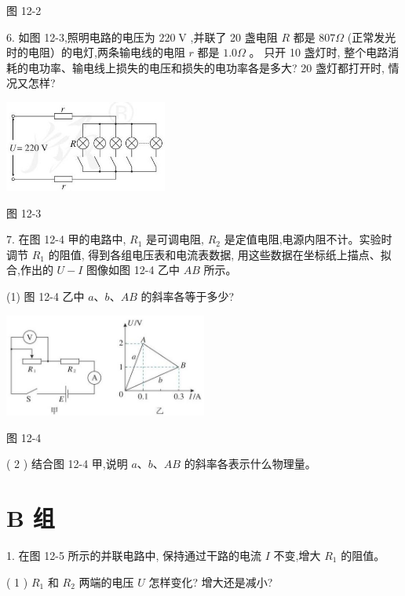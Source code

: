 \documentclass[10pt]{article}
\begin{document}
图 12-2

6. 如图 12-3,照明电路的电压为 \({220}\mathrm{\;V}\) ,并联了 20 盏电阻 \(R\) 都是 \({807\Omega }\) (正常发光时的电阻）的电灯,两条输电线的电阻 \(r\) 都是 \({1.0\Omega }\) 。 只开 10 盏灯时, 整个电路消耗的电功率、输电线上损失的电压和损失的电功率各是多大? 20 盏灯都打开时, 情况又怎样?

\begin{center}
\includegraphics[max width=0.4\textwidth]{images/01911d5f-8e38-70c0-b5b8-2b399bd115b6_105_726487.jpg}
\end{center}

图 12-3

7. 在图 12-4 甲的电路中, \({R}_{1}\) 是可调电阻, \({R}_{2}\) 是定值电阻,电源内阻不计。实验时调节 \({R}_{1}\) 的阻值, 得到各组电压表和电流表数据, 用这些数据在坐标纸上描点、拟合,作出的 \(U - I\) 图像如图 12-4 乙中 \({AB}\) 所示。

(1) 图 12-4 乙中 \(a\text{、}b\text{、}{AB}\) 的斜率各等于多少?

\begin{center}
\includegraphics[max width=0.5\textwidth]{images/01911d5f-8e38-70c0-b5b8-2b399bd115b6_106_719440.jpg}
\end{center}

图 12-4

( 2 ) 结合图 12-4 甲,说明 \(a\text{、}b\text{、}{AB}\) 的斜率各表示什么物理量。

\section*{B 组}

1. 在图 12-5 所示的并联电路中, 保持通过干路的电流 \(I\) 不变,增大 \({R}_{1}\) 的阻值。

( 1 ) \({R}_{1}\) 和 \({R}_{2}\) 两端的电压 \(U\) 怎样变化? 增大还是减小?
\end{document}
